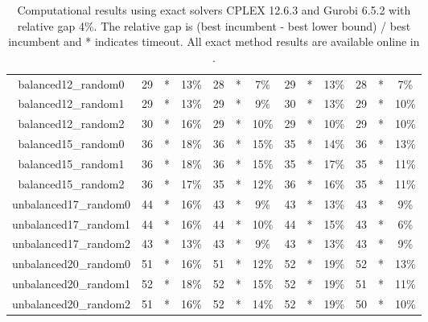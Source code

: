 \begin{table}
\begin{adjustbox}{center}
\begin{tabular}{|ccccccccccccc|}
balanced12\_random0 & 29 & * & 13\% & 28 & * & 7\% & 29 & * & 13\% & 28 & * & 7\% \\ 
balanced12\_random1 & 29 & * & 13\% & 29 & * & 9\% & 30 & * & 13\% & 29 & * & 10\% \\ 
balanced12\_random2 & 30 & * & 16\% & 29 & * & 10\% & 29 & * & 10\% & 29 & * & 10\% \\ 
balanced15\_random0 & 36 & * & 18\% & 36 & * & 15\% & 35 & * & 14\% & 36 & * & 13\% \\ 
balanced15\_random1 & 36 & * & 18\% & 36 & * & 15\% & 35 & * & 17\% & 35 & * & 11\% \\ 
balanced15\_random2 & 36 & * & 17\% & 35 & * & 12\% & 36 & * & 16\% & 35 & * & 11\% \\ 
unbalanced17\_random0 & 44 & * & 16\% & 43 & * & 9\% & 43 & * & 13\% & 43 & * & 9\% \\ 
unbalanced17\_random1 & 44 & * & 16\% & 44 & * & 10\% & 44 & * & 15\% & 43 & * & 6\% \\ 
unbalanced17\_random2 & 43 & * & 13\% & 43 & * & 9\% & 43 & * & 13\% & 43 & * & 9\% \\ 
unbalanced20\_random0 & 51 & * & 16\% & 51 & * & 12\% & 52 & * & 19\% & 52 & * & 13\% \\ 
unbalanced20\_random1 & 52 & * & 18\% & 52 & * & 15\% & 52 & * & 19\% & 51 & * & 11\% \\ 
unbalanced20\_random2 & 51 & * & 16\% & 52 & * & 14\% & 52 & * & 19\% & 50 & * & 10\% \\ 
\hline 
\end{tabular} 
\end{adjustbox} 
\vspace*{-0.2cm} 
\caption{Computational results using exact solvers CPLEX 12.6.3 and Gurobi 6.5.2 with relative gap 4\%. The relative gap is (best incumbent - best lower bound) / best incumbent and  * indicates timeout. All exact method results are available online in \cite{source_code}.} 
\label{Table:Exact_Methods} 
\end{table} 
